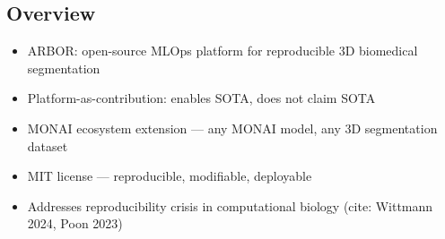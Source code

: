 
\subsection{Overview}
\begin{itemize}
  \item ARBOR: open-source MLOps platform for reproducible 3D biomedical segmentation
  \item Platform-as-contribution: enables SOTA, does not claim SOTA
  \item MONAI ecosystem extension --- any MONAI model, any 3D segmentation dataset
  \item MIT license --- reproducible, modifiable, deployable
  \item Addresses reproducibility crisis in computational biology (cite: Wittmann 2024, Poon 2023)
\end{itemize}
